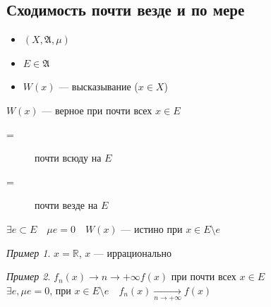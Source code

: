 \documentclass[oneside]{book}
\newcommand{\R}{\mathbb{R}}
\newcommand{\A}{\mathfrak{A}}
\theoremstyle{plain}
\theoremstyle{remark}
\newtheorem*{examp}{Пример}
\theoremstyle{definition}
\begin{document}
\subsection{Сходимость почти везде и по мере}
\label{sec:orga19e53f}
\begin{defintion}
\begin{itemize}
\item \((X, \A, \mu)\)
\item \(E \in \A\)
\item \(W(x)\) --- высказывание (\(x\in X\))
\end{itemize}
\(W(x)\) --- верное при почти всех \(x \in E\)
\begin{description}
\item[{=}] почти всюду на \(E\)
\item[{=}] почти везде на \(E\)
\end{description}
\(\exists e \subset E\quad \mu e= 0\quad W(x)\) --- истино при \(x \in E \setminus e\)
\end{defintion}
\begin{examp}
\(x = \R\), \(x\) --- иррационально
\end{examp}
\begin{examp}
\(f_n(x) \xrightarrow{}{n \to + \infty} f(x)\) при почти всех \(x \in E\) \\
\(\exists e, \mu e = 0\), при \(x\in E \setminus e\quad f_n(x) \xrightarrow[n \to + \infty]{}f(x)\) \\
\end{examp}
\end{document}
